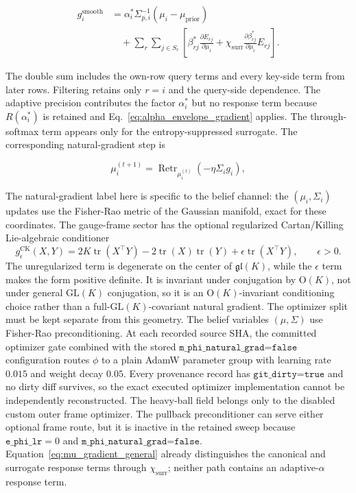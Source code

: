\documentclass[twoside,11pt]{article}
\begin{document}
\begin{equation}
\boxed{
\begin{aligned}
g_i^{\mathrm{smooth}}
&=\alpha_i^*\Sigma_{p,i}^{-1}
(\mu_i-\mu_{\mathrm{prior}})\\
&\quad+\sum_r\sum_{j\in S_r}
\left[
\beta_{rj}^*\frac{\partial E_{rj}}{\partial\mu_i}
+\chi_{\mathrm{surr}}
\frac{\partial\beta_{rj}^*}{\partial\mu_i}E_{rj}
\right].
\end{aligned}
}
\label{eq:mu_gradient_general}
\end{equation}

The double sum includes the own-row query terms and every key-side term from later rows. Filtering retains only $r=i$ and the query-side dependence. The adaptive precision contributes the factor $\alpha_i^*$ but no response term because $R(\alpha_i^*)$ is retained and Eq.~\eqref{eq:alpha_envelope_gradient} applies. The through-softmax term appears only for the entropy-suppressed surrogate. The corresponding natural-gradient step is

\begin{equation}
\boxed{
\mu_i^{(t+1)}
=\operatorname{Retr}_{\mu_i^{(t)}}
\left(-\eta\Sigma_i g_i\right),
}
\label{eq:natural_gradient_general}
\end{equation}

The natural-gradient label here is specific to the belief channel: the $(\mu_i, \Sigma_i)$ updates use the Fisher-Rao metric of the Gaussian manifold, exact for these coordinates. The gauge-frame sector has the optional regularized Cartan/Killing Lie-algebraic conditioner
\begin{equation}
g_{\epsilon}^{\mathrm{CK}}(X,Y)
=2K\operatorname{tr}(X^\top Y)-2\operatorname{tr}(X)\operatorname{tr}(Y)
+\epsilon\operatorname{tr}(X^\top Y),
\qquad \epsilon>0.
\label{eq:regularized_cartan_killing_preconditioner}
\end{equation}
The unregularized term is degenerate on the center of $\mathfrak{gl}(K)$, while the $\epsilon$ term makes the form positive definite. It is invariant under conjugation by $\mathrm{O}(K)$, not under general $\mathrm{GL}(K)$ conjugation, so it is an $\mathrm{O}(K)$-invariant conditioning choice rather than a full-$\mathrm{GL}(K)$-covariant natural gradient. The optimizer split must be kept separate from this geometry. The belief variables $(\mu,\Sigma)$ use Fisher-Rao preconditioning. At each recorded source SHA, the committed optimizer gate combined with the stored $\texttt{m\_phi\_natural\_grad=false}$ configuration routes $\phi$ to a plain AdamW parameter group with learning rate $0.015$ and weight decay $0.05$. Every provenance record has $\texttt{git\_dirty=true}$ and no dirty diff survives, so the exact executed optimizer implementation cannot be independently reconstructed. The heavy-ball field belongs only to the disabled custom outer frame optimizer. The pullback preconditioner can serve either optional frame route, but it is inactive in the retained sweep because $\texttt{e\_phi\_lr}=0$ and $\texttt{m\_phi\_natural\_grad=false}$. Equation~\eqref{eq:mu_gradient_general} already distinguishes the canonical and surrogate response terms through $\chi_{\mathrm{surr}}$; neither path contains an adaptive-$\alpha$ response term.
\end{document}

